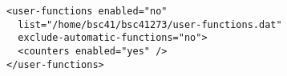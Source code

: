\begin{verbatim}
<user-functions enabled="no"
  list="/home/bsc41/bsc41273/user-functions.dat"
  exclude-automatic-functions="no">
  <counters enabled="yes" />
</user-functions>
\end{verbatim}

